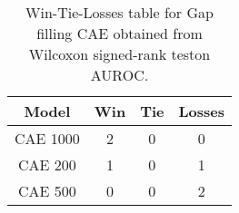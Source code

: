 \begin{table}[H]
\centering
\begin{tabular}{|c|c|c|c|}

\textbf{Model} &  \textbf{Win} &  \textbf{Tie} &  \textbf{Losses} \\
\hline

      CAE 1000 &             2 &             0 &                0 \\
\hline
       CAE 200 &             1 &             0 &                1 \\
\hline
       CAE 500 &             0 &             0 &                2 \\
\hline

\end{tabular}
\caption{Win-Tie-Losses table for Gap filling CAE obtained from Wilcoxon signed-rank teston AUROC.}
\label{tab:gap_filling_cae_model_comparison}
\end{table}